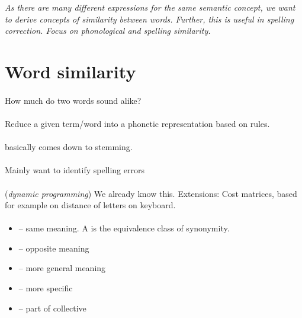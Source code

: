 \documentclass[10pt,twocolumn]{article}
\begin{document}
\textit{As there are many different expressions for the same semantic concept,
  we want to derive concepts of similarity between words. Further, this is
  useful in spelling correction. Focus on phonological and spelling similarity.}

\section{Word similarity}

\paragraph{} How much do two words sound alike?

\paragraph{ } Reduce a given term/word into a phonetic
representation based on rules.

\paragraph{} basically comes down to stemming.

\paragraph{} Mainly want to identify spelling errors

\paragraph{} (\textit{dynamic
  programming}) We already know this. Extensions: Cost matrices, based for
example on distance of letters on keyboard.

\paragraph{} 
\begin{itemize}
\item {} -- same meaning. A  is the equivalence class of synonymity.
\item {} -- opposite meaning
\item {} -- more general meaning
\item {} -- more specific
\item {} -- part of collective
\end{itemize}
\end{document}
